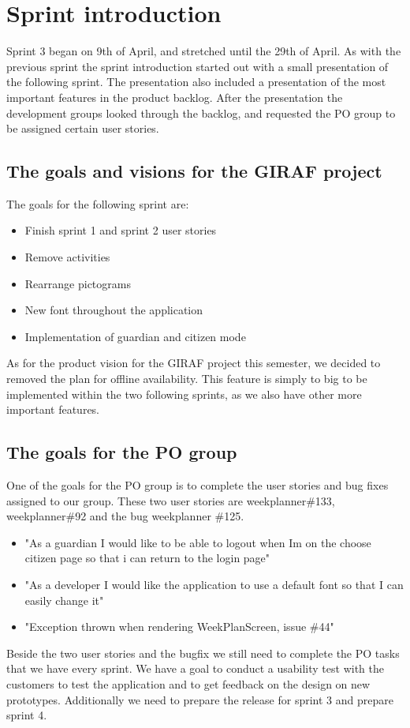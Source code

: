 \section{Sprint introduction}
Sprint 3 began on 9th of April, and stretched until the 29th of April.
As with the previous sprint the sprint introduction started out with a small presentation of the following sprint. 
The presentation also included a presentation of the most important features in the product backlog.
After the presentation the development groups looked through the backlog, and requested the PO group to be assigned certain user stories.

\subsection{The goals and visions for the GIRAF project}
The goals for the following sprint are:

\begin{itemize}
    \item Finish sprint 1 and sprint 2 user stories
    \item Remove activities
    \item Rearrange pictograms
    \item New font throughout the application
    \item Implementation of guardian and citizen mode
\end{itemize}

\noindent
As for the product vision for the GIRAF project this semester, we decided to removed the plan for offline availability. 
This feature is simply to big to be implemented within the two following sprints, as we also have other more important features.

\subsection{The goals for the PO group}
One of the goals for the PO group is to complete the user stories and bug fixes assigned to our group.
These two user stories are weekplanner\#133, weekplanner\#92 and the bug weekplanner \#125.

\begin{itemize}
    \item "As a guardian I would like to be able to logout when Im on the choose citizen page so that i can return to the login page"
    \item "As a developer I would like the application to use a default font so that I can easily change it"
    \item "Exception thrown when rendering WeekPlanScreen, issue \#44"
\end{itemize}
\noindent
Beside the two user stories and the bugfix we still need to complete the PO tasks that we have every sprint.
We have a goal to conduct a usability test with the customers to test the application and to get feedback on the design on new prototypes.
Additionally we need to prepare the release for sprint 3 and prepare sprint 4.

